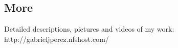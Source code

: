\documentclass[margin,line]{res}
\begin{document}
\begin{resume}
\section{\sc More}
Detailed  descriptions, pictures and videos of my work: http://gabrieljperez.nfshost.com/    \\

\end{resume}
\end{document}
